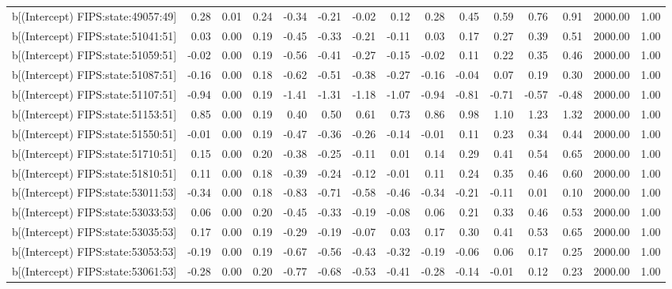 \begin{table}[ht]
\begin{tabular}{rrrrrrrrrrrrrrr}
  b[(Intercept) FIPS:state:49057:49] & 0.28 & 0.01 & 0.24 & -0.34 & -0.21 & -0.02 & 0.12 & 0.28 & 0.45 & 0.59 & 0.76 & 0.91 & 2000.00 & 1.00 \\ 
  b[(Intercept) FIPS:state:51041:51] & 0.03 & 0.00 & 0.19 & -0.45 & -0.33 & -0.21 & -0.11 & 0.03 & 0.17 & 0.27 & 0.39 & 0.51 & 2000.00 & 1.00 \\ 
  b[(Intercept) FIPS:state:51059:51] & -0.02 & 0.00 & 0.19 & -0.56 & -0.41 & -0.27 & -0.15 & -0.02 & 0.11 & 0.22 & 0.35 & 0.46 & 2000.00 & 1.00 \\ 
  b[(Intercept) FIPS:state:51087:51] & -0.16 & 0.00 & 0.18 & -0.62 & -0.51 & -0.38 & -0.27 & -0.16 & -0.04 & 0.07 & 0.19 & 0.30 & 2000.00 & 1.00 \\ 
  b[(Intercept) FIPS:state:51107:51] & -0.94 & 0.00 & 0.19 & -1.41 & -1.31 & -1.18 & -1.07 & -0.94 & -0.81 & -0.71 & -0.57 & -0.48 & 2000.00 & 1.00 \\ 
  b[(Intercept) FIPS:state:51153:51] & 0.85 & 0.00 & 0.19 & 0.40 & 0.50 & 0.61 & 0.73 & 0.86 & 0.98 & 1.10 & 1.23 & 1.32 & 2000.00 & 1.00 \\ 
  b[(Intercept) FIPS:state:51550:51] & -0.01 & 0.00 & 0.19 & -0.47 & -0.36 & -0.26 & -0.14 & -0.01 & 0.11 & 0.23 & 0.34 & 0.44 & 2000.00 & 1.00 \\ 
  b[(Intercept) FIPS:state:51710:51] & 0.15 & 0.00 & 0.20 & -0.38 & -0.25 & -0.11 & 0.01 & 0.14 & 0.29 & 0.41 & 0.54 & 0.65 & 2000.00 & 1.00 \\ 
  b[(Intercept) FIPS:state:51810:51] & 0.11 & 0.00 & 0.18 & -0.39 & -0.24 & -0.12 & -0.01 & 0.11 & 0.24 & 0.35 & 0.46 & 0.60 & 2000.00 & 1.00 \\ 
  b[(Intercept) FIPS:state:53011:53] & -0.34 & 0.00 & 0.18 & -0.83 & -0.71 & -0.58 & -0.46 & -0.34 & -0.21 & -0.11 & 0.01 & 0.10 & 2000.00 & 1.00 \\ 
  b[(Intercept) FIPS:state:53033:53] & 0.06 & 0.00 & 0.20 & -0.45 & -0.33 & -0.19 & -0.08 & 0.06 & 0.21 & 0.33 & 0.46 & 0.53 & 2000.00 & 1.00 \\ 
  b[(Intercept) FIPS:state:53035:53] & 0.17 & 0.00 & 0.19 & -0.29 & -0.19 & -0.07 & 0.03 & 0.17 & 0.30 & 0.41 & 0.53 & 0.65 & 2000.00 & 1.00 \\ 
  b[(Intercept) FIPS:state:53053:53] & -0.19 & 0.00 & 0.19 & -0.67 & -0.56 & -0.43 & -0.32 & -0.19 & -0.06 & 0.06 & 0.17 & 0.25 & 2000.00 & 1.00 \\ 
  b[(Intercept) FIPS:state:53061:53] & -0.28 & 0.00 & 0.20 & -0.77 & -0.68 & -0.53 & -0.41 & -0.28 & -0.14 & -0.01 & 0.12 & 0.23 & 2000.00 & 1.00 \\ 

\end{tabular}
\end{table}
